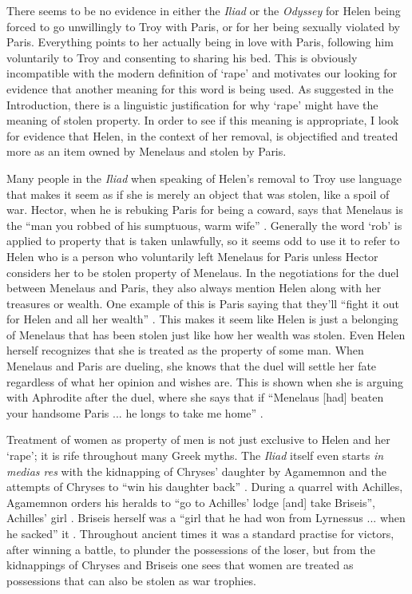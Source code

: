 \documentclass[11pt]{article}
\begin{document}
There seems to be no evidence in either the \emph{Iliad} or the \emph{Odyssey} for Helen being forced to go unwillingly to Troy with Paris, or for her being sexually violated by Paris.
Everything points to her actually being in love with Paris, following him voluntarily to Troy and consenting to sharing his bed.
This is obviously incompatible with the modern definition of `rape' and motivates our looking for evidence that another meaning for this word is being used.
As suggested in the Introduction, there is a linguistic justification for why `rape' might have the meaning of stolen property.
In order to see if this meaning is appropriate, I look for evidence that Helen, in the context of her removal, is objectified and treated more as an item owned by Menelaus and stolen by Paris.

Many people in the \emph{Iliad} when speaking of Helen's removal to Troy use language that makes it seem as if she is merely an object that was stolen, like a spoil of war.
Hector, when he is rebuking Paris for being a coward, says that Menelaus is the ``man you robbed of his sumptuous, warm wife'' \cite[book 3, line 61]{Iliad}.
Generally the word `rob' is applied to property that is taken unlawfully, so it seems odd to use it to refer to Helen who is a person who voluntarily left Menelaus for Paris unless Hector considers her to be stolen property of Menelaus.
In the negotiations for the duel between Menelaus and Paris, they also always mention Helen along with her treasures or wealth.
One example of this is Paris saying that they'll ``fight it out for Helen and all her wealth'' \cite[book 3, line 85]{Iliad}.
This makes it seem like Helen is just a belonging of Menelaus that has been stolen just like how her wealth was stolen.
Even Helen herself recognizes that she is treated as the property of some man.
When Menelaus and Paris are dueling, she knows that the duel will settle her fate regardless of what her opinion and wishes are.
This is shown when she is arguing with Aphrodite after the duel, where she says that if ``Menelaus [had] beaten your handsome Paris ... he longs to take me home''  \cite[book 3, line 466]{Iliad}.

Treatment of women as property of men is not just exclusive to Helen and her `rape'; it is rife throughout many Greek myths.
The \emph{Iliad} itself even starts \emph{in medias res} with the kidnapping of Chryses' daughter by Agamemnon and the attempts of Chryses to ``win his daughter back'' \cite[book 1, line 14]{Iliad}.
During a quarrel with Achilles,  Agamemnon orders his heralds to ``go to Achilles' lodge [and] take Briseis'', Achilles' girl \cite[book 1, line 379]{Iliad}.
Briseis herself was a ``girl that he had won from Lyrnessus ... when he sacked'' it \cite[book 2, line 690]{Iliad-rieu}.
Throughout ancient times it was a standard practise for victors, after winning a battle, to plunder the possessions of the loser, but from the kidnappings of Chryses and Briseis one sees that women are treated as possessions that can also be stolen as war trophies.
\end{document}
